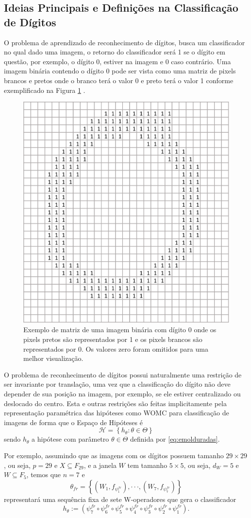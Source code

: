 \subsection{Ideias Principais e Definições na Classificação de Dígitos}
\label{subsec:ideias}

O problema de aprendizado de reconhecimento de dígitos, busca um classificador no qual dado uma imagem, o retorno do classificador será 1 se o dígito em questão, por exemplo, o dígito 0, estiver na imagem e 0 caso contrário. Uma imagem binária contendo o dígito 0 pode ser vista como uma matriz de pixels brancos e pretos onde o branco terá o valor 0 e preto terá o valor 1 conforme exemplificado na Figura \ref{fig:dig_0} . 

\begin{figure}
    \centering
    \includegraphics[width=.4\textwidth]{figuras/digito_0.png}
    \caption{Exemplo de matriz de uma imagem binária com dígito 0 onde os pixels pretos são representados por 1 e os pixels brancos são representados por 0. Os valores zero foram omitidos para uma melhor visualização.}
    \label{fig:dig_0}
\end{figure}

O problema de reconhecimento de dígitos possui naturalmente uma restrição de ser invariante por translação, uma vez que a classificação do dígito não deve depender de sua posição na imagem, por exemplo, se ele estiver centralizado ou deslocado do centro. Esta e outras restrições são feitas implicitamente pela representação paramétrica das hipóteses como WOMC para classificação de imagens de forma que o Espaço de Hipóteses é
$$\mathcal{H} = \left\{ h_{\theta} : \theta \in \Theta \right\}$$
sendo $h_{\theta} $ a hipótese com parâmetro $\theta \in \Theta$ definida por \eqref{eq:emolduradas}.

Por exemplo, assumindo que as imagens com os dígitos possuem tamanho $29 \times 29$, ou seja, $p = 29$ e $X \subseteq F_{29}$, e a janela $W$ tem tamanho $5 \times 5$, ou seja, $d_{W} = 5$ e $W \subseteq F_{5}$, temos que $n = 7$ e
$$ \theta_{fr} = \left\{ \left(W_{1}, f_{\psi_{1}^{fr}} \right), \cdot \cdot \cdot, \left(W_{7}, f_{\psi_{7}^{fr}} \right) \right\}$$
representará uma sequência fixa de sete W-operadores que gera o classificador
$$h_{\theta} := \left( \psi_{7}^{fr} \circ \psi_{6}^{fr} \circ \psi_{5}^{fr} \circ \psi_{4}^{fr} \circ \psi_{3}^{fr} \circ \psi_{2}^{fr} \circ \psi_{1}^{fr}  \right).$$


